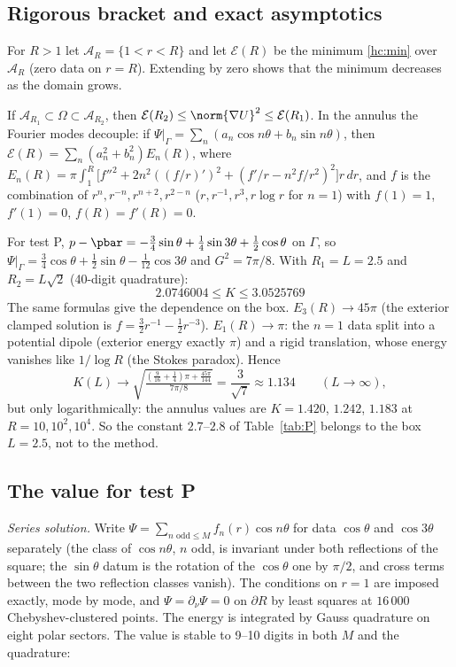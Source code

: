 \subsection{Rigorous bracket and exact asymptotics}

For $R>1$ let $\mathcal A_R=\{1<r<R\}$ and let $\mathcal E(R)$ be the minimum \eqref{hc:min} over $\mathcal A_R$ (zero data on
$r=R$). Extending by zero shows that the minimum decreases as the domain grows.

\begin{proposition}\label{hc:bracket}
If $\mathcal A_{R_1}\subset\Omega\subset\mathcal A_{R_2}$, then $\mathcal E(R_2)\le\norm{\nabla U}^2\le\mathcal E(R_1)$. In the annulus the
Fourier modes decouple: if $\Psi|_\Gamma=\sum_n(a_n\cos n\theta+b_n\sin n\theta)$, then $\mathcal E(R)=\sum_n(a_n^2+b_n^2)E_n(R)$, where
$E_n(R)=\pi\int_1^R\bigl[f''^2+2n^2((f/r)')^2+(f'/r-n^2f/r^2)^2\bigr]r\,dr$, and $f$ is the combination of
$r^n,r^{-n},r^{n+2},r^{2-n}$ ($r,r^{-1},r^3,r\log r$ for $n=1$) with $f(1)=1$, $f'(1)=0$, $f(R)=f'(R)=0$.
\end{proposition}

For test P, $p-\pbar=-\frac34\sin\theta+\frac14\sin3\theta+\frac12\cos\theta$ on $\Gamma$, so
$\Psi|_\Gamma=\frac34\cos\theta+\frac12\sin\theta-\frac1{12}\cos3\theta$ and $G^2=7\pi/8$. With $R_1=L=2.5$ and $R_2=L\sqrt2$
(40-digit quadrature):
\[
\boxed{\,2.0746004\le K\le3.0525769\,}
\]
The same formulas give the dependence on the box. $E_3(R)\to45\pi$ (the exterior clamped solution is
$f=\frac32r^{-1}-\frac12r^{-3}$). $E_1(R)\to\pi$: the $n=1$ data split into a potential dipole (exterior energy exactly $\pi$) and
a rigid translation, whose energy vanishes like $1/\log R$ (the Stokes paradox). Hence
\[
K(L)\longrightarrow\sqrt{\tfrac{(\frac9{16}+\frac14)\pi+\frac{45\pi}{144}}{7\pi/8}}=\frac3{\sqrt7}\approx1.134\qquad(L\to\infty),
\]
but only logarithmically: the annulus values are $K=1.420$, $1.242$, $1.183$ at $R=10,10^2,10^4$. So the constant
$2.7$--$2.8$ of Table~\ref{tab:P} belongs to the box $L=2.5$, not to the method.

\subsection{The value for test P}

\emph{Series solution.} Write $\Psi=\sum_{n\text{ odd}\le M}f_n(r)\cos n\theta$ for data $\cos\theta$ and $\cos3\theta$ separately (the class of
$\cos n\theta$, $n$ odd, is invariant under both reflections of the square; the $\sin\theta$ datum is the rotation of the
$\cos\theta$ one by $\pi/2$, and cross terms between the two reflection classes vanish). The conditions on $r=1$ are imposed
exactly, mode by mode, and $\Psi=\partial_\nu\Psi=0$ on $\partial R$ by least squares at $16\,000$ Chebyshev-clustered points.
The energy is integrated by Gauss quadrature on eight polar sectors. The value is stable to 9--10 digits in both $M$ and the
quadrature:

